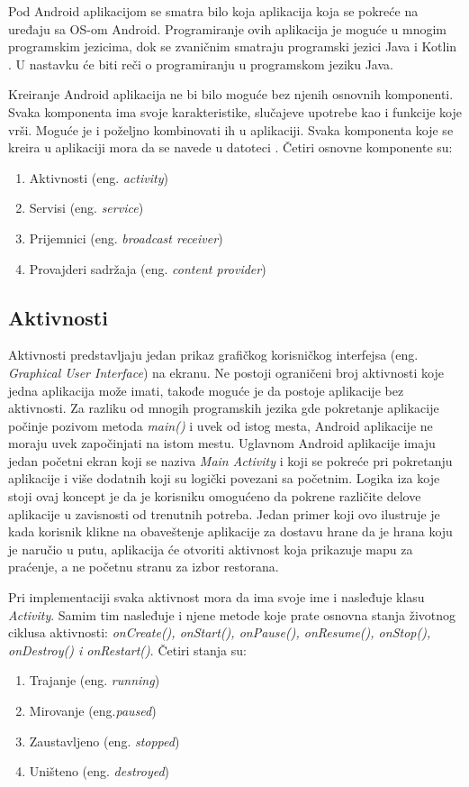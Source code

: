 \documentclass[android.tex]{subfiles}
\begin{document}
Pod Android aplikacijom se smatra bilo koja aplikacija koja se pokreće na uređaju sa OS-om Android. Programiranje ovih aplikacija je moguće u mnogim programskim jezicima, dok se zvaničnim smatraju programski jezici Java i Kotlin \cite{sajt:kotlin}. U nastavku će biti reči o programiranju u programskom jeziku Java.

Kreiranje Android aplikacija ne bi bilo moguće bez njenih osnovnih komponenti. Svaka komponenta ima svoje karakteristike, slučajeve upotrebe kao i funkcije koje vrši. Moguće je i poželjno kombinovati ih u aplikaciji. Svaka komponenta koje se kreira u aplikaciji mora da se navede u datoteci . Četiri osnovne komponente su:

\begin{enumerate}
\item Aktivnosti (eng. \textit{activity})
\item Servisi (eng. \textit{service})
\item Prijemnici (eng. \textit{broadcast receiver})
\item Provajderi sadržaja (eng. \textit{content provider})
\end{enumerate}

\subsection{Aktivnosti}
Aktivnosti predstavljaju jedan prikaz grafičkog korisničkog interfejsa (eng. \textit{Graphical User Interface}) na ekranu. Ne postoji ograničeni broj aktivnosti koje jedna aplikacija može imati, takođe moguće je da postoje aplikacije bez aktivnosti. Za razliku od mnogih programskih jezika gde pokretanje aplikacije počinje pozivom metoda \textit{main()} i uvek od istog mesta, Android aplikacije ne moraju uvek započinjati na istom mestu. Uglavnom Android aplikacije imaju jedan početni ekran koji se naziva \textit{Main Activity} i  koji se pokreće pri pokretanju aplikacije i više dodatnih koji su logički povezani sa početnim. Logika iza koje stoji ovaj koncept je da je korisniku omogućeno da pokrene različite delove aplikacije u zavisnosti od trenutnih potreba. Jedan primer koji ovo ilustruje je kada korisnik klikne na obaveštenje aplikacije za dostavu hrane da je hrana koju je naručio u putu, aplikacija će otvoriti aktivnost koja prikazuje mapu za praćenje, a ne početnu stranu za izbor restorana.

Pri implementaciji svaka aktivnost mora da ima svoje ime i nasleđuje klasu \textit{Activity}. Samim tim nasleđuje i njene metode koje prate osnovna stanja životnog ciklusa aktivnosti: \textit{onCreate(), onStart(), onPause(), onResume(), onStop(), onDestroy() i onRestart()}\cite{book:and9cookbook}. Četiri stanja su:
\begin{enumerate}
    \item Trajanje (eng. \textit{running})
    \item Mirovanje (eng.\textit{paused})
    \item Zaustavljeno (eng. \textit{stopped})
    \item Uništeno (eng. \textit{destroyed})
\end{enumerate}
\end{document}
